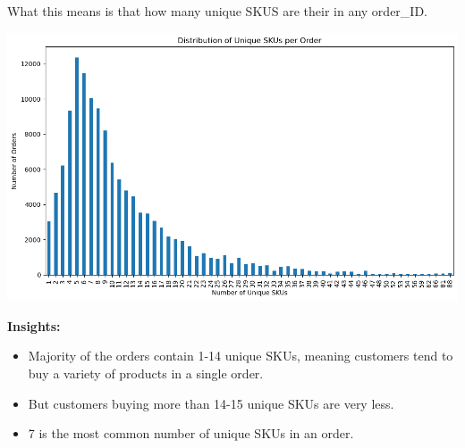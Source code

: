 \documentclass{article}
\begin{document}
    \large
    What this means is that how many unique SKUS are their in any order_ID.
    \normalsize
    \begin{center}
        \includegraphics[width=1\columnwidth]{images/sku-dis.png}
    \end{center}
    \begin{tcolorbox}[colback=lightPink!5!white,colframe=lightPink!75!black,title=Insights]
        \textbf{Insights:}
        \begin{itemize}
            \item Majority of the orders contain 1-14 unique SKUs, meaning customers tend to buy a variety of products in a single order.
            \item But customers buying more than 14-15 unique SKUs are very less.
            \item 7 is the most common number of unique SKUs in an order.
        \end{itemize}
    \end{tcolorbox}
  
    
\end{document}
